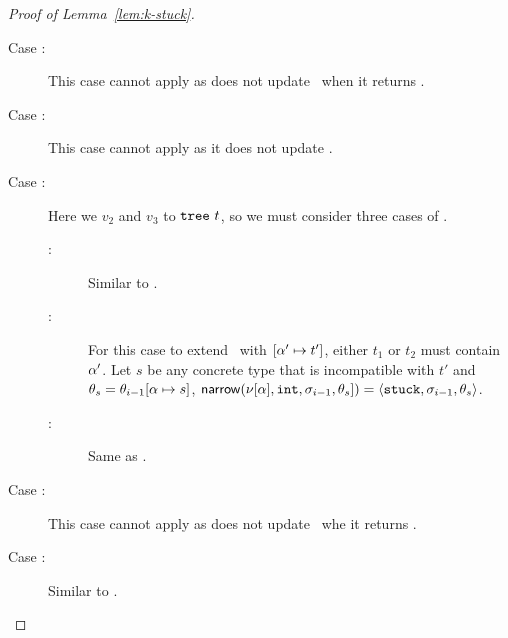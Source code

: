 \begin{proof}[Proof of Lemma~\ref{lem:k-stuck}]
\begin{description}
    \item[Case \reappbad:]
      This case cannot apply as \forcesym does not update \tsu\ when
      it returns \stuck.
    \item[Case \releafgood:]
      This case cannot apply as it does not update \tsu.
    \item[Case \renodegood:]
      Here we \forcesym $v_2$ and $v_3$ to $\mathtt{tree}\ t$,
      so we must consider three cases of \forcesym.
      \begin{description}
      \item[:]
        Similar to \replusgood.
      \item[:]
        For this case to extend \tsu\ with $[\alpha' \mapsto t']$,
        either $t_1$ or $t_2$ must contain $\alpha'$.
        Let $s$ be any concrete type that is incompatible with $t'$
        and $\theta_s = \theta_{i-1}[\alpha \mapsto s]$,
        $\mathsf{narrow}(\nu[\alpha], \mathtt{int}, \sigma_{i-1}, \theta_s]) = \langle \mathtt{stuck}, \sigma_{i-1}, \theta_s \rangle$.
      \item[:]
        Same as .
      \end{description}
    \item[Case \renodebadone:]
      This case cannot apply as \forcesym does not update \tsu\ whe
      it returns \stuck.
    \item[Case \renodebadtwo:]
      Similar to \renodegood.

\end{description}
\end{proof}
